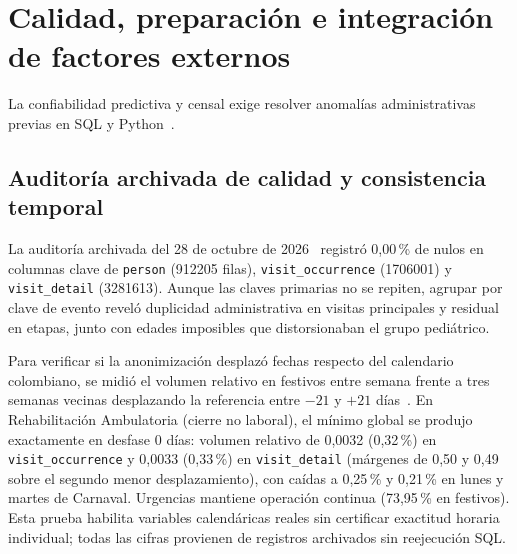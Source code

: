 
\section{Calidad, preparación e integración de factores externos}

La confiabilidad predictiva y censal exige resolver anomalías administrativas previas en SQL y Python~\cite{mediflow2026calidad,mediflow2026informe}.

\subsection{Auditoría archivada de calidad y consistencia temporal}

La auditoría archivada del 28 de octubre de 2026~\cite{mediflow2026calidad} registró 0,00\,\% de nulos en columnas clave de \texttt{person} (\num{912205} filas), \texttt{visit\_occurrence} (\num{1706001}) y \texttt{visit\_detail} (\num{3281613}). Aunque las claves primarias no se repiten, agrupar por clave de evento reveló duplicidad administrativa en visitas principales y residual en etapas, junto con edades imposibles que distorsionaban el grupo pediátrico.

Para verificar si la anonimización desplazó fechas respecto del calendario colombiano, se midió el volumen relativo en festivos entre semana frente a tres semanas vecinas desplazando la referencia entre $-21$ y $+21$ días~\cite{mediflow2026calidad}. En Rehabilitación Ambulatoria (cierre no laboral), el mínimo global se produjo exactamente en desfase 0 días: volumen relativo de 0,0032 (0,32\,\%) en \texttt{visit\_occurrence} y 0,0033 (0,33\,\%) en \texttt{visit\_detail} (márgenes de 0,50 y 0,49 sobre el segundo menor desplazamiento), con caídas a 0,25\,\% y 0,21\,\% en lunes y martes de Carnaval. Urgencias mantiene operación continua (73,95\,\% en festivos). Esta prueba habilita variables calendáricas reales sin certificar exactitud horaria individual; todas las cifras provienen de registros archivados sin reejecución SQL.

